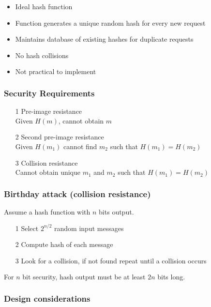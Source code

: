 \documentclass[a4paper]{article}
\begin{document}
\begin{itemize}
  \item Ideal hash function
  \item Function generates a unique random hash for every new request
  \item Maintains database of existing hashes for duplicate requests
  \item No hash collisions
  \item Not practical to implement
\end{itemize}

\subsubsection{Security Requirements}

\begin{enumerate}
  \item[1]
    Pre-image resistance \\
    Given $H(m)$, cannot obtain $m$
  \item[2]
    Second pre-image resistance \\
    Given $H(m_{1})$ cannot find $m_{2}$ such that $H(m_{1}) = H(m_{2})$
  \item[3]
    Collision resistance \\
    Cannot obtain unique $m_{1}$ and $m_{2}$ such that $H(m_{1}) = H(m_{2})$
\end{enumerate}

\subsubsection{Birthday attack (collision resistance)}

Assume a hash function with $n$ bits output.

\begin{enumerate}
  \item[1] Select $2^{n/2}$ random input messages
  \item[2] Compute hash of each message
  \item[3] Look for a collision, if not found repeat until a collision occurs
\end{enumerate}

For $n$ bit security, hash output must be at least $2n$ bits long.

\subsubsection{Design considerations}
\end{document}
